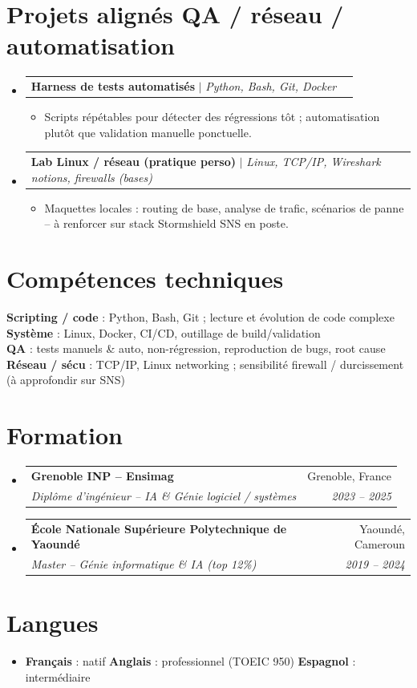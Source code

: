 \documentclass[a4paper,10.5pt]{article}
\makeatletter
\newcommand{\resumeItem}[1]{\item\small{#1}}
\newcommand{\resumeSubheading}[4]{
  \vspace{3pt}\item
  \begin{tabular*}{0.97\textwidth}[t]{l@{\extracolsep{\fill}}r}
    \textbf{#1} & #2 \\
    \textit{\small #3} & \textit{\small #4} \\
  \end{tabular*}\vspace{1pt}
}
\newcommand{\resumeProjectHeading}[2]{
  \vspace{2pt}\item
  \begin{tabular*}{0.97\textwidth}{l@{\extracolsep{\fill}}r}
    \small #1 & #2 \\
  \end{tabular*}\vspace{1pt}
}
\newcommand{\resumeSubHeadingListStart}{\begin{itemize}[leftmargin=0.08in, label={}]}
\newcommand{\resumeSubHeadingListEnd}{\end{itemize}}
\makeatother
\begin{document}
\section{Projets align\'es QA / r\'eseau / automatisation}
\resumeSubHeadingListStart
  \resumeProjectHeading
    {\textbf{Harness de tests automatis\'es} $|$ \emph{Python, Bash, Git, Docker}}{}
    \begin{itemize}
      \resumeItem{Scripts r\'ep\'etables pour d\'etecter des r\'egressions t\^ot ; automatisation plut\^ot que validation manuelle ponctuelle.}
    \end{itemize}
  \resumeProjectHeading
    {\textbf{Lab Linux / r\'eseau (pratique perso)} $|$ \emph{Linux, TCP/IP, Wireshark notions, firewalls (bases)}}{}
    \begin{itemize}
      \resumeItem{Maquettes locales : routing de base, analyse de trafic, sc\'enarios de panne -- \`a renforcer sur stack Stormshield SNS en poste.}
    \end{itemize}
\resumeSubHeadingListEnd

\section{Comp\'etences techniques}
\begin{itemize}[leftmargin=0.08in, label={}]
  \small{\item{
    \textbf{Scripting / code} : Python, Bash, Git ; lecture et \'evolution de code complexe \\
    \textbf{Syst\`eme} : Linux, Docker, CI/CD, outillage de build/validation \\
    \textbf{QA} : tests manuels \& auto, non-r\'egression, reproduction de bugs, root cause \\
    \textbf{R\'eseau / s\'ecu} : TCP/IP, Linux networking ; sensibilit\'e firewall / durcissement (\`a approfondir sur SNS)
  }}
\end{itemize}

\section{Formation}
\resumeSubHeadingListStart
  \resumeSubheading
    {Grenoble INP -- Ensimag}{Grenoble, France}
    {Dipl\^ome d'ing\'enieur -- IA \& G\'enie logiciel / syst\`emes}{2023 -- 2025}
  \resumeSubheading
    {\'Ecole Nationale Sup\'erieure Polytechnique de Yaound\'e}{Yaound\'e, Cameroun}
    {Master -- G\'enie informatique \& IA (top 12\%)}{2019 -- 2024}
\resumeSubHeadingListEnd

\section{Langues}
\begin{itemize}[leftmargin=0.08in, label={}]
  \item \textbf{Fran\c{c}ais} : natif \quad \textbf{Anglais} : professionnel (TOEIC 950) \quad \textbf{Espagnol} : interm\'ediaire
\end{itemize}
\end{document}
